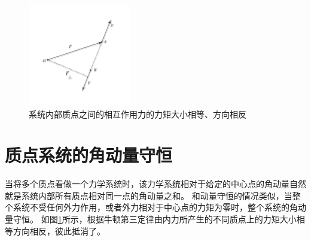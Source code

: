

\begin{figure}[htbp]
	\begin{center}
		\includegraphics[width=0.4\textwidth]{images/angular-momentum-angular-conservation-many.pdf}
		\caption{系统内部质点之间的相互作用力的力矩大小相等、方向相反}
		\label{fig: 系统内部质点之间的相互作用力的力矩大小相等、方向相反}
	\end{center}
\end{figure}
\section{质点系统的角动量守恒}
当将多个质点看做一个力学系统时，该力学系统相对于给定的中心点的角动量自然就是系统内部所有质点相对同一点的角动量之和。
和动量守恒的情况类似，当整个系统不受任何外力作用，或者外力相对于中心点的力矩为零时，整个系统的角动量守恒。
如图\ref{fig: 系统内部质点之间的相互作用力的力矩大小相等、方向相反}所示，根据牛顿第三定律由内力所产生的不同质点上的力矩大小相等方向相反，彼此抵消了。




%
%
%
%
%



